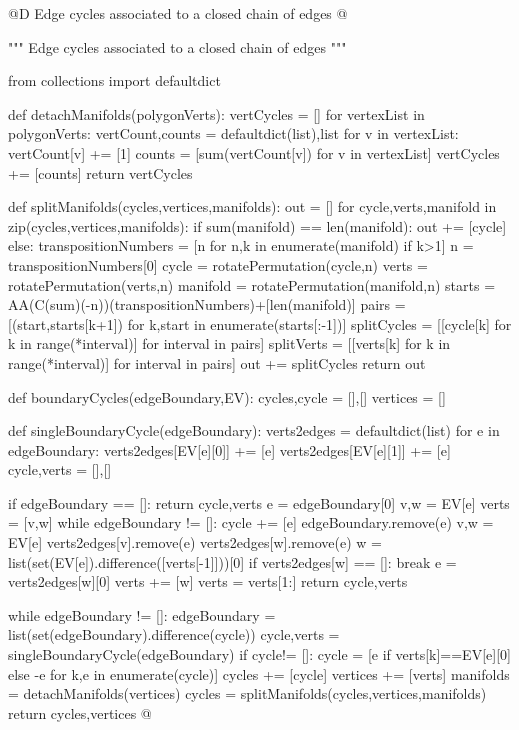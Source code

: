 \documentclass[11pt,oneside]{article}    %
\begin{document}
@D Edge cycles associated to a closed chain of edges
@{""" Edge cycles associated to a closed chain of edges """

from collections import defaultdict

def detachManifolds(polygonVerts):
    vertCycles = []
    for vertexList in polygonVerts:
        vertCount,counts = defaultdict(list),list
        for v in vertexList: 
            vertCount[v] += [1]
        counts = [sum(vertCount[v]) for v in vertexList]
        vertCycles += [counts]
    return vertCycles
    
def splitManifolds(cycles,vertices,manifolds):
    out = []
    for cycle,verts,manifold in zip(cycles,vertices,manifolds):
        if sum(manifold) == len(manifold):
            out += [cycle] 
        else:
            transpositionNumbers = [n for n,k in enumerate(manifold) if k>1]
            n = transpositionNumbers[0]
            cycle = rotatePermutation(cycle,n) 
            verts = rotatePermutation(verts,n) 
            manifold = rotatePermutation(manifold,n) 
            starts = AA(C(sum)(-n))(transpositionNumbers)+[len(manifold)]
            pairs = [(start,starts[k+1]) for k,start in enumerate(starts[:-1])]
            splitCycles = [[cycle[k] for k in range(*interval)] for interval in pairs]
            splitVerts = [[verts[k] for k in range(*interval)] for interval in pairs]
            out += splitCycles
    return out

def boundaryCycles(edgeBoundary,EV):
    cycles,cycle = [],[]
    vertices = []
    
    def singleBoundaryCycle(edgeBoundary):
        verts2edges = defaultdict(list)
        for e in edgeBoundary:
            verts2edges[EV[e][0]] += [e]
            verts2edges[EV[e][1]] += [e]
        cycle,verts = [],[]
        
        if edgeBoundary == []: return cycle,verts
        e = edgeBoundary[0]
        v,w = EV[e]
        verts = [v,w]
        while edgeBoundary != []:
            cycle += [e]
            edgeBoundary.remove(e)
            v,w = EV[e]
            verts2edges[v].remove(e)
            verts2edges[w].remove(e)
            w = list(set(EV[e]).difference([verts[-1]]))[0]
            if verts2edges[w] == []: break
            e = verts2edges[w][0]
            verts += [w]
        verts = verts[1:]
        return cycle,verts
        
    while edgeBoundary != []:
        edgeBoundary = list(set(edgeBoundary).difference(cycle))
        cycle,verts = singleBoundaryCycle(edgeBoundary)
        if cycle!= []: 
            cycle = [e if verts[k]==EV[e][0] else -e for k,e in enumerate(cycle)]
            cycles += [cycle]
            vertices += [verts]
    manifolds = detachManifolds(vertices)
    cycles = splitManifolds(cycles,vertices,manifolds)
    return cycles,vertices
@}
\end{document}

